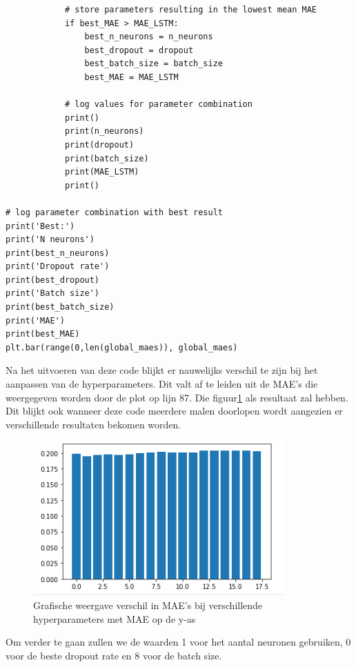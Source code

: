 \begin{verbatim}
            # store parameters resulting in the lowest mean MAE
            if best_MAE > MAE_LSTM:
                best_n_neurons = n_neurons
                best_dropout = dropout
                best_batch_size = batch_size
                best_MAE = MAE_LSTM
            
            # log values for parameter combination
            print()
            print(n_neurons)
            print(dropout)
            print(batch_size)
            print(MAE_LSTM)
            print()    

# log parameter combination with best result
print('Best:')
print('N neurons')
print(best_n_neurons)
print('Dropout rate')
print(best_dropout)
print('Batch size')
print(best_batch_size)
print('MAE')
print(best_MAE)
plt.bar(range(0,len(global_maes)), global_maes)
\end{verbatim}

Na het uitvoeren van deze code blijkt er nauwelijks verschil te zijn bij het aanpassen van de hyperparameters. Dit valt af te leiden uit de MAE's die weergegeven worden door de plot op lijn 87. Die figuur\ref{fig:uvnslstmbar} als resultaat zal hebben.
Dit blijkt ook wanneer deze code meerdere malen doorlopen wordt aangezien er verschillende resultaten bekomen worden.

\begin{figure}
    \centering
    \caption{Grafische weergave verschil in MAE's bij verschillende hyperparameters met MAE op de y-as}
    \label{fig:uvnslstmbar}
    \includegraphics[width=0.7\linewidth]{uv_ns_LSTM_bar}
\end{figure}

Om verder te gaan zullen we de waarden 1 voor het aantal neuronen gebruiken, 0 voor de beste dropout rate en 8 voor de batch size. 

